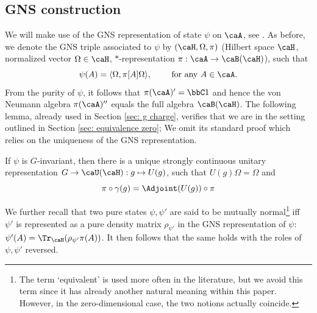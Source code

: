 \subsection{GNS construction}\label{sec: representations}
We will make use of the GNS representation of state $\psi$ on $\caA$, see \cite{BratRob}. As before, we denote the GNS triple associated to $\psi$ by   $(\caH,\Omega,\pi)$ 
(Hilbert space $\caH$,  normalized vector $\Omega\in\caH$,  $*$-representation  $\pi:\caA\to\caB(\caH)$), such that 
$$\psi(A)=\langle\Omega, \pi[A]\Omega\rangle, \qquad \text{ for any $A\in\caA$}.  $$     From the purity of $\psi$, it follows that $\pi(\caA)'=\bbC 1$ and hence the von Neumann algebra $\pi(\caA)''$ equals the full algebra $\caB(\caH)$. The following lemma, already used in Section \ref{sec: g charge}, verifies that we are in the setting outlined in Section \ref{sec: equivalence zero}; We omit its standard proof which relies on the uniqueness of the GNS representation.
\begin{lemma}\label{lem: gns} If $\psi$ is $G$-invariant, then there is a unique strongly continuous unitary representation $G\to \caU(\caH): g\mapsto U(g)$, such that $U(g)\Omega=\Omega$ and
	\begin{equation} \label{eq: rep of g action}
		\pi\circ \gamma(g)= \Adjoint(U(g))\circ \pi
	\end{equation}
\end{lemma} 
\noindent We further recall that two pure states $\psi,\psi'$ are said to be mutually normal\footnote{The term `equivalent' is used more often in the literature, but we avoid this term since it has already another natural meaning within this paper. However, in the zero-dimensional case, the two notions actually coincide.} iff\  $\psi'$ is represented as a pure density matrix $\rho_{\psi'}$ in the GNS representation of $\psi$: $\psi'(A) = \Tr_\caH(\rho_{\psi'}\pi(A))$. It then follows that the same holds with the roles of $\psi,\psi'$ reversed. 

